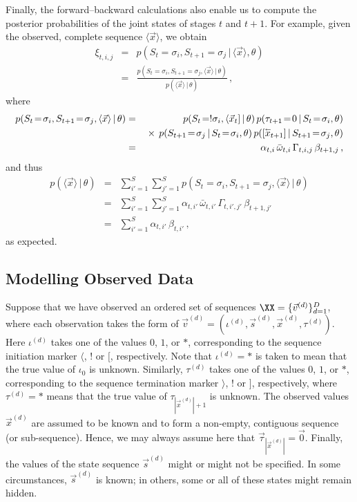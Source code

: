 \documentclass[a4paper]{article}
\newcommand{\rvec}[1]{\accentset{\leftarrow}{#1}}
\begin{document}
Finally, the forward--backward calculations also enable us to compute the posterior probabilities of the joint states of stages $t$ and $t+1$.
For example, given the observed, complete sequence $\langle\vec{x}\rangle$, we obtain
\begin{eqnarray}
\xi_{t,i,j} & = &
   p(S_t\!=\!\sigma_i,S_{t+1}\!=\!\sigma_j\,|\,\langle\vec{x}\rangle,\theta)
\nonumber\\& = & 
   \frac{p(S_t\!=\!\sigma_i,S_{t+1}\!=\!\sigma_j,\langle\vec{x}\rangle\,|\,\theta)}
        {p(\langle\vec{x}\rangle\,|\,\theta)}
\,,
\label{eq:xi_t_i_j}
\end{eqnarray}
where
\begin{eqnarray}
   p(S_t\!=\!\sigma_i,S_{t+1}\!=\!\sigma_j,\langle\vec{x}\rangle\,|\,\theta)
& = & 
   p(S_t\!=!\sigma_i,\langle\vec{x}_t]\,|\,\theta)
     \,p(\tau_{t+1}\!=\!0\,|\,S_t\!=\!\sigma_i,\theta)
\nonumber\\&&{}\times
     \,p(S_{t+1}\!=\!\sigma_j\,|\,S_t\!=\!\sigma_i,\theta)
	 \,p([\rvec{x}_{t+1}]\,|\,S_{t+1}\!=\!\sigma_j,\theta)
\nonumber\\& = & 
   \alpha_{t,i}\,\bar{\omega}_{t,i}\,\Gamma_{t,i,j}\,\beta_{t+1,j}
\,,
\end{eqnarray}
and thus
\begin{eqnarray}
   p(\langle\vec{x}\rangle\,|\,\theta)
& = &
   \sum_{i'=1}^{S}\sum_{j'=1}^{S}p(S_t\!=\!\sigma_i,S_{t+1}\!=\!\sigma_j,\langle\vec{x}\rangle\,|\,\theta)
\nonumber\\& = & 
   \sum_{i'=1}^{S}\sum_{j'=1}^{S}\alpha_{t,i'}\,\bar{\omega}_{t,i'}\,\Gamma_{t,i',j'}\,\beta_{t+1,j'}
\nonumber\\& = & 
   \sum_{i'=1}^{S}\alpha_{t,i'}\,\beta_{t,i'}
\,,
\end{eqnarray}
as expected.

\subsection{Modelling Observed Data}

Suppose that we have observed an ordered set of sequences $\XX=\{\vec{v}^{(d)}\}_{d=1}^{D}$,
where each observation takes the form of $\vec{v}^{(d)}=(\iota^{(d)},\vec{s}^{(d)},\vec{x}^{(d)},\tau^{(d)})$.
Here $\iota^{(d)}$ takes one of the values $0$, $1$, or $*$, corresponding to the sequence initiation marker $\langle$, $!$ or $[$, respectively.
Note that $\iota^{(d)}=*$ is taken to mean that the true value of $\iota_0$ is unknown.
Similarly, $\tau^{(d)}$ takes one of the values $0$, $1$, or $*$, corresponding to the sequence termination marker $\rangle$, $!$ or $]$, respectively,
where $\tau^{(d)}=*$ means that the true value of $\tau_{|\vec{x}^{(d)}|+1}$ is unknown.
The observed values $\vec{x}^{(d)}$ are assumed to be known and to form a non-empty, contiguous sequence (or sub-sequence).
Hence, we may always assume here that $\vec{\tau}_{|\vec{x}^{(d)}|}=\vec{0}$.
Finally, the values of the state sequence $\vec{s}^{(d)}$ might or might not be specified.
In some circumstances, $\vec{s}^{(d)}$ is known; in others, some or all of these states might remain hidden.
\end{document}
